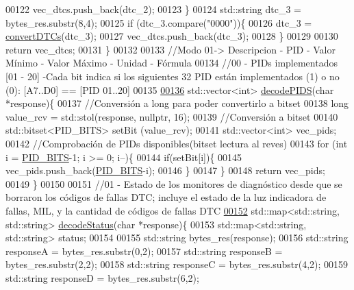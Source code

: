 \begin{DoxyCode}
00122         vec\_dtcs.push\_back(dtc\_2);
00123     \}
00124     std::string dtc\_3 = bytes\_res.substr(8,4);
00125     \textcolor{keywordflow}{if} (dtc\_3.compare(\textcolor{stringliteral}{"0000"}))\{
00126         dtc\_3 = \hyperlink{decoders_8cpp_a4f18f411252f4c60fae4af320989c262}{convertDTCs}(dtc\_3);
00127         vec\_dtcs.push\_back(dtc\_3);
00128     \}
00129 
00130     \textcolor{keywordflow}{return} vec\_dtcs;
00131 \}
00132 
00133     \textcolor{comment}{//Modo 01-> Descripcion - PID - Valor Mínimo - Valor Máximo - Unidad - Fórmula}
00134 \textcolor{comment}{//00 - PIDs implementados [01 - 20] -Cada bit indica si los siguientes 32 PID están implementados (1) o no
       (0): [A7..D0] == [PID 01..20] }
00135 
\hyperlink{decoders_8hpp_aef44cca306ed9c74b146d2b7dd058763}{00136} std::vector<int> \hyperlink{decoders_8cpp_aef44cca306ed9c74b146d2b7dd058763}{decodePIDS}(\textcolor{keywordtype}{char} *response)\{
00137     \textcolor{comment}{//Conversión a long para poder convertirlo a bitset}
00138     \textcolor{keywordtype}{long} value\_rcv = std::stol(response, \textcolor{keyword}{nullptr}, 16);
00139     \textcolor{comment}{//Conversión a bitset}
00140     std::bitset<PID\_BITS> setBit (value\_rcv);
00141     std::vector<int> vec\_pids;
00142     \textcolor{comment}{//Comprobación de PIDs disponibles(bitset lectura al reves)}
00143     \textcolor{keywordflow}{for} (\textcolor{keywordtype}{int} i = \hyperlink{decoders_8hpp_a8a092c91721f7da8bb812b510993ad3e}{PID\_BITS}-1; i >= 0; i--)\{
00144         \textcolor{keywordflow}{if}(setBit[i])\{
00145             vec\_pids.push\_back(\hyperlink{decoders_8hpp_a8a092c91721f7da8bb812b510993ad3e}{PID\_BITS}-i);
00146         \}
00147     \}
00148     \textcolor{keywordflow}{return} vec\_pids;
00149 \}
00150 
00151 \textcolor{comment}{//01 - Estado de los monitores de diagnóstico desde que se borraron los códigos de fallas DTC; incluye el
       estado de la luz indicadora de fallas, MIL, y la cantidad de códigos de fallas DTC }
\hyperlink{decoders_8hpp_aca9cad863d8603615597a0291804c8ae}{00152} std::map<std::string, std::string> \hyperlink{decoders_8cpp_aca9cad863d8603615597a0291804c8ae}{decodeStatus}(\textcolor{keywordtype}{char} *response)\{
00153     std::map<std::string, std::string> status;
00154 
00155     std::string bytes\_res(response);
00156     std::string responseA = bytes\_res.substr(0,2);
00157     std::string responseB = bytes\_res.substr(2,2);
00158     std::string responseC = bytes\_res.substr(4,2);
00159     std::string responseD = bytes\_res.substr(6,2);

\end{DoxyCode}
